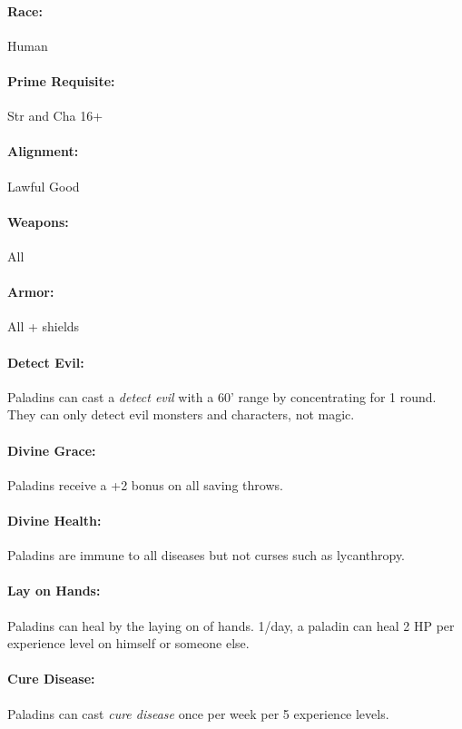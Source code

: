 \begin{multicols}{2}
\paragraph{Race:} Human

\paragraph{Prime Requisite:} Str and Cha 16+

\paragraph{Alignment:} Lawful Good

\paragraph{Weapons:} All

\paragraph{Armor:} All + shields

\paragraph{Detect Evil:} Paladins can cast a \textit{detect evil} with a 60' range by concentrating for 1 round.  They can only detect evil monsters and characters, not magic.

\paragraph{Divine Grace:} Paladins receive a +2 bonus on all saving throws.

\paragraph{Divine Health:} Paladins are immune to all diseases but not curses such as lycanthropy.
  
\paragraph{Lay on Hands:} Paladins can heal by the laying on of hands.  1/day, a paladin can heal 2 HP per experience level on himself or someone else.  

\paragraph{Cure Disease:} Paladins can cast \textit{cure disease} once per week per 5 experience levels.


\end{multicols}
